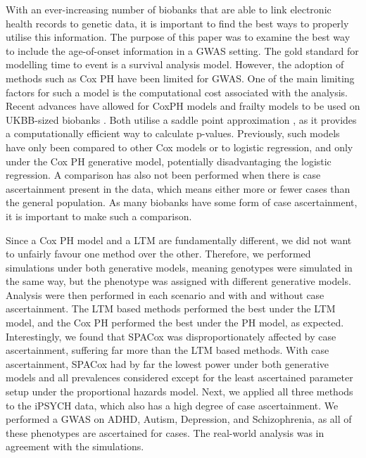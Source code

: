 
With an ever-increasing number of biobanks that are able to link electronic health records to genetic data, it is important to find the best ways to properly utilise this information. The purpose of this paper was to examine the best way to include the age-of-onset information in a GWAS setting. The gold standard for modelling time to event is a survival analysis model. However, the adoption of methods such as Cox PH have been limited for GWAS. One of the main limiting factors for such a model is the computational cost associated with the analysis. Recent advances have allowed for CoxPH models and frailty models to be used on UKBB-sized biobanks \cite{bi2020fast,dey2022efficient}. Both utilise a saddle point approximation \cite{daniels1954saddlepoint}, as it provides a computationally efficient way to calculate p-values. Previously, such models have only been compared to other Cox models or to logistic regression, and only under the Cox PH generative model, potentially disadvantaging the logistic regression. A comparison has also not been performed when there is case ascertainment present in the data, which means either more or fewer cases than the general population. As many biobanks have some form of case ascertainment, it is important to make such a comparison. 

Since a Cox PH model and a LTM are fundamentally different, we did not want to unfairly favour one method over the other. Therefore, we performed simulations under both generative models, meaning genotypes were simulated in the same way, but the phenotype was assigned with different generative models. Analysis were then performed in each scenario and with and without case ascertainment. The LTM based methods performed the best under the LTM model, and the Cox PH performed the best under the PH model, as expected. Interestingly, we found that SPACox was disproportionately affected by case ascertainment, suffering far more than the LTM based methods. With case ascertainment, SPACox had by far the lowest power under both generative models and all prevalences considered except for the least ascertained parameter setup under the proportional hazards model. Next, we applied all three methods to the iPSYCH data, which also has a high degree of case ascertainment. We performed a GWAS on ADHD, Autism, Depression, and Schizophrenia, as all of these phenotypes are ascertained for cases. The real-world analysis was in agreement with the simulations. 

